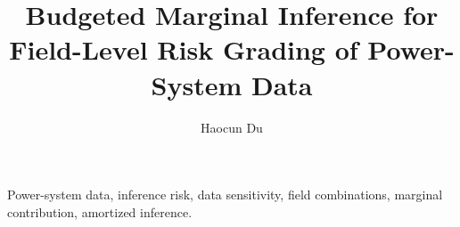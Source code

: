 \documentclass[journal]{IEEEtran}
\begin{document}
\title{Budgeted Marginal Inference for Field-Level Risk Grading of Power-System Data}
\author{Haocun Du}
\maketitle

\begin{IEEEkeywords}
Power-system data, inference risk, data sensitivity, field combinations, marginal contribution, amortized inference.
\end{IEEEkeywords}






\FloatBarrier

\appendices



\end{document}
